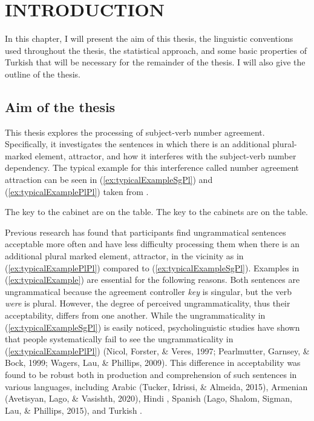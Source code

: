 \chapter{INTRODUCTION} \label{ch:intro}

In this chapter, I will present the aim of this thesis, the linguistic conventions used throughout the thesis, the statistical approach, and some basic properties of Turkish that will be necessary for the remainder of the thesis. I will also give the outline of the thesis.

\section{Aim of the thesis}

This thesis explores the processing of subject-verb number agreement. Specifically, it investigates the sentences in which there is an additional plural-marked element, attractor, and how it interferes with the subject-verb number dependency. The typical example for this interference called number agreement attraction can be seen in (\ref{ex:typicalExampleSgPl}) and (\ref{ex:typicalExamplePlPl}) taken from .

\ea \label{ex:typicalExample}
  \ea * The key to the cabinet are on the table. \label{ex:typicalExampleSgPl}
  \ex * The key to the cabinet{s} are on the table. \label{ex:typicalExamplePlPl} 
  \z
\z

Previous research has found that participants find ungrammatical sentences acceptable more often and have less difficulty processing them when there is an additional plural marked element, attractor, in the vicinity as in (\ref{ex:typicalExamplePlPl}) compared to (\ref{ex:typicalExampleSgPl}). Examples in (\ref{ex:typicalExample}) are essential for the following reasons. Both sentences are ungrammatical because the agreement controller {\it key} is singular, but the verb {\it were} is plural. However, the degree of perceived ungrammaticality, thus their acceptability, differs from one another. While the ungrammaticality in (\ref{ex:typicalExampleSgPl}) is easily noticed, psycholinguistic studies have shown that people systematically fail to see the ungrammaticality in (\ref{ex:typicalExamplePlPl}) (Nicol, Forster, \& Veres, 1997; Pearlmutter, Garnsey, \& Bock, 1999; Wagers, Lau, \& Phillips, 2009). This difference in acceptability was found to be robust both in production \citep{BockMiller:1991} and comprehension \citep{NicolEtAl1997,PearlmutterGarnseyBock:1999} of such sentences in various languages, including Arabic (Tucker, Idrissi, \& Almeida, 2015), Armenian (Avetisyan, Lago, \& Vasishth, 2020), Hindi \citep{BhatiaDillon:2020}, Spanish (Lago, Shalom, Sigman, Lau, \& Phillips, 2015), and Turkish \citep{LagoEtAl2019}. 

